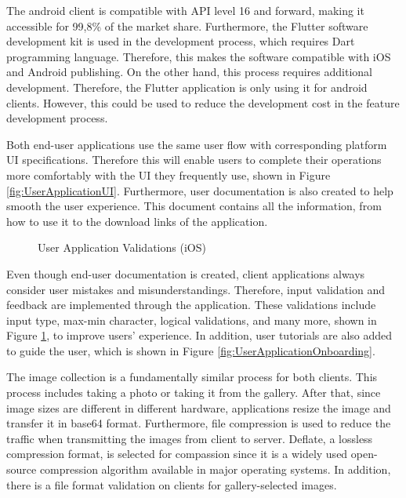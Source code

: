 The android client is compatible with API level 16 and forward, making it accessible for 99,8\% of the market share. Furthermore, the Flutter software development kit is used in the development process, which requires Dart programming language. Therefore, this makes the software compatible with iOS and Android publishing. On the other hand, this process requires additional development. Therefore, the Flutter application is only using it for android clients. However, this could be used to reduce the development cost in the feature development process.

Both end-user applications use the same user flow with corresponding platform UI specifications. Therefore this will enable users to complete their operations more comfortably with the UI they frequently use, shown in Figure \ref{fig:UserApplicationUI}. Furthermore, user documentation is also created to help smooth the user experience. This document contains all the information, from how to use it to the download links of the application. 

\begin{figure}[htbp]
\centering
{}
\caption{User Application Validations (iOS)}
\label{fig:UserApplicationValidations}
\end{figure}

Even though end-user documentation is created, client applications always consider user mistakes and misunderstandings. Therefore, input validation and feedback are implemented through the application. These validations include input type, max-min character, logical validations, and many more, shown in Figure \ref{fig:UserApplicationValidations}, to improve users' experience. In addition, user tutorials are also added to guide the user, which is shown in Figure \ref{fig:UserApplicationOnboarding}.

The image collection is a fundamentally similar process for both clients. This process includes taking a photo or taking it from the gallery. After that, since image sizes are different in different hardware, applications resize the image and transfer it in base64 format. Furthermore, file compression is used to reduce the traffic when transmitting the images from client to server. Deflate, a lossless compression format, is selected for compassion since it is a widely used open-source compression algorithm available in major operating systems. In addition, there is a file format validation on clients for gallery-selected images. 

